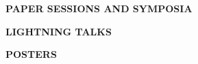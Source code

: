 \documentclass[twoside]{article}
\begin{document}
\newpage
\clearpage
{}

\begin{center}
\Large{\textbf{PAPER SESSIONS AND SYMPOSIA}}
\end{center}

\begin{multicols*}{2}

\end{multicols*}


\newpage

\begin{center}
\Large{\textbf{LIGHTNING TALKS}}
\end{center}

\begin{multicols*}{2}

\end{multicols*}


\newpage

\begin{center}
\Large{\textbf{POSTERS}}
\end{center}

\begin{multicols*}{2}

\end{multicols*}


\end{document}
